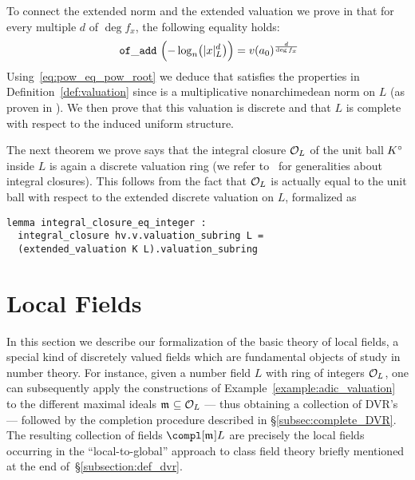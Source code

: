 \documentclass[sigplan,10pt,anonymous,review]{acmart}
\begin{document}
To connect the extended norm and the extended valuation we prove in \href{https://github.com/LCFT-Lean/local_fields/blob/76ad487d09babdb0018f394a5634526637ee014a/src/discrete_valuation_ring/discrete_norm.lean#L153}{\extlink} that for every multiple $d$ of $\deg f_x$, the following equality holds:
\begin{equation}\label{eq:pow_eq_pow_root}
\mathtt{\ of\_add\ }
\Bigl(-\log_n\bigl(\lvert x\rvert_L^{d}\bigr)\Bigr)=v(a_0)^\frac{d}{\deg f_x}
\end{equation}
Using~\eqref{eq:pow_eq_pow_root} we deduce that  satisfies the properties in Definition~\ref{def:valuation} since  is a multiplicative nonarchimedean norm on $L$ (as proven in \cite[\S3.2]{deF23}). We then prove that this valuation is discrete\href{https://github.com/LCFT-Lean/local_fields/blob/76ad487d09babdb0018f394a5634526637ee014a/src/discrete_valuation_ring/extensions.lean#L443}{\extlink} and that  $L$ is complete with respect to the induced uniform structure\href{https://github.com/LCFT-Lean/local_fields/blob/76ad487d09babdb0018f394a5634526637ee014a/src/discrete_valuation_ring/extensions.lean#L557}{\extlink}. 

The next theorem we prove says that the integral closure $\mathcal{O}_{L}$ of the unit ball ${K}^\circ$ inside $L$ is again a discrete valuation ring\href{https://github.com/LCFT-Lean/local_fields/blob/76ad487d09babdb0018f394a5634526637ee014a/src/discrete_valuation_ring/extensions.lean#L612}{\extlink} (we refer to~\cite[Chapitre~5, \S2, n$^\circ$1]{Bou85} for generalities about integral closures). This follows from the fact that $\mathcal{O}_{L}$ is actually equal to the unit ball with respect to the extended discrete valuation on $L$, formalized as\href{https://github.com/LCFT-Lean/local_fields/blob/76ad487d09babdb0018f394a5634526637ee014a/src/discrete_valuation_ring/extensions.lean#L584}{\extlink}
\begin{lstlisting}
lemma integral_closure_eq_integer :
  integral_closure hv.v.valuation_subring L =
  (extended_valuation K L).valuation_subring
\end{lstlisting}

\section{Local Fields}\label{sec:local_fields}
In this section we describe our formalization of the basic theory of local fields, a special kind of discretely valued fields which are fundamental objects of study in number theory. For instance, given a number field $L$ with ring of integers $\mathcal{O}_{L}$, one can subsequently apply the constructions of Example~\ref{example:adic_valuation} to the different maximal ideals $\maxid[\empty]\subseteq\rint{L}$ --- thus obtaining a collection of DVR's --- followed by the completion procedure described in \S\ref{subsec:complete_DVR}. The resulting collection of fields $\compl[{\maxid[\empty]}]{L}$ are precisely the local fields occurring in the ``local-to-global'' approach to class field theory briefly mentioned at the end of~\S\ref{subsection:def_dvr}.
\end{document}
